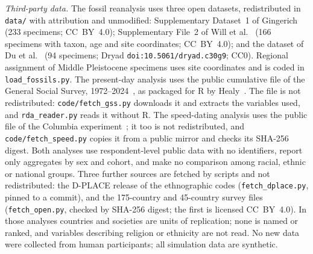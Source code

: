 \emph{Third-party data.} The fossil reanalysis uses three open datasets, redistributed in \texttt{data/} with attribution
and unmodified: Supplementary Dataset~1 of Gingerich~\cite{gingerich2022} (233 specimens; CC~BY~4.0); Supplementary File~2 of
Will et al.~\cite{will2021} (166 \Homo{} specimens with taxon, age and site coordinates; CC~BY~4.0); and the dataset of Du et
al.~\cite{du2018} (94 specimens; Dryad \texttt{doi:10.5061/dryad.c30g9}; CC0). Regional assignment of Middle Pleistocene
specimens uses site coordinates and is coded in \texttt{load\_fossils.py}. The present-day analysis uses the public
cumulative file of the General Social Survey, 1972--2024~\cite{gss2024}, as packaged for R by Healy~\cite{healygssr}. The file
is not redistributed: \texttt{code/fetch\_gss.py} downloads it and extracts the variables used, and \texttt{rda\_reader.py}
reads it without R. The speed-dating analysis uses the public file of the Columbia experiment~\cite{fisman2006}; it too is
not redistributed, and \texttt{code/fetch\_speed.py} copies it from a public mirror and checks its SHA-256 digest. Both
analyses use respondent-level public data with no identifiers, report only aggregates by sex and cohort, and make no
comparison among racial, ethnic or national groups. Three further sources are fetched by scripts and not redistributed:
the D-PLACE release of the ethnographic codes (\texttt{fetch\_dplace.py}, pinned to a commit), and the 175-country and
45-country survey files (\texttt{fetch\_open.py}, checked by SHA-256 digest; the first is licensed CC~BY~4.0). In those
analyses countries and societies are units of replication; none is named or ranked, and variables describing religion or
ethnicity are not read. No new data were collected from human
participants; all simulation data are synthetic.
